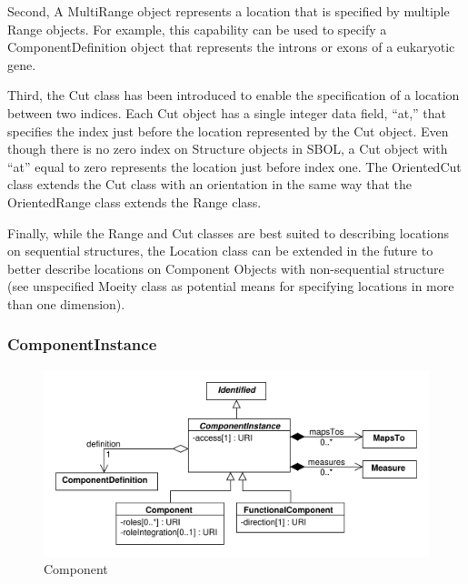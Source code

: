 \documentclass[draftspec]{sbmlpkgspec}
\begin{document}
Second, A MultiRange object represents a location that is specified by multiple Range objects. For example, this capability can be used to specify a ComponentDefinition object that represents the introns or exons of a eukaryotic gene.

Third, the Cut class has been introduced to enable the specification of a location between two indices. Each Cut object has a single integer data field, “at,” that specifies the index just before the location represented by the Cut object. Even though there is no zero index on Structure objects in SBOL, a Cut object with “at” equal to zero represents the location just before index one. The OrientedCut class extends the Cut class with an orientation in the same way that the OrientedRange class extends the Range class.

Finally, while the Range and Cut classes are best suited to describing locations on sequential structures, the Location class can be extended in the future to better describe locations on Component Objects with non-sequential structure (see unspecified Moeity class as potential means for specifying locations in more than one dimension).




\subsubsection{ComponentInstance}
\label{sec:ComponentInstance}

\begin{figure}[ht]
\begin{center}
\includegraphics[scale=0.6]{uml/component_instance}
\caption[]{Component}
\label{uml:component}
\end{center}
\end{figure}
\end{document}
